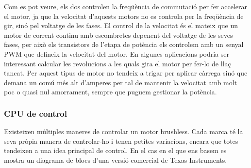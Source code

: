 Com es pot veure, els dos controlen la freqüència de commutació per fer accelerar el motor, ja que la velocitat d'aquests motors no es controla per la freqüència de gir, sinó pel voltatge de les fases. El control de la velocitat és el mateix que un motor de corrent continu amb escombretes depenent del voltatge de les seves fases, per això els transistors de l'etapa de potència els controlem amb un senyal PWM que defineix la velocitat del motor. En algunes aplicacions podria ser interessant calcular les revolucions a les quals gira el motor per fer-lo de llaç tancat. Per aquest tipus de motor no tendeix a trigar per aplicar càrrega sinó que demana un comú més alt d'amperes per tal de mantenir la velocitat amb molt poc o quasi nul amorrament, sempre que puguem gestionar la potència.

\subsubsection{CPU de control}

Existeixen múltiples maneres de controlar un motor brushless. Cada marca té la seva pròpia manera de controlar-ho i tenen petites variacions, encara que totes tendeixen a una idea principal de control. En el cas en el que ens basem es mostra un diagrama de blocs d'una versió comercial de Texas Instruments.

